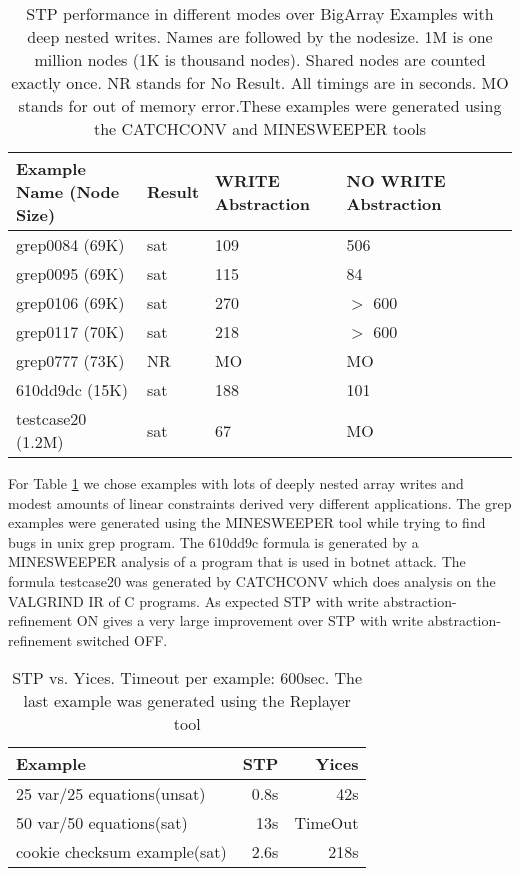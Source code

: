 \begin{table}[t]
\begin{center}
\begin{tabular}{|l|l|l|l|l|l|}
\hline
{\bf Example Name (Node Size)} & {\bf Result} & {\bf WRITE Abstraction} & {\bf NO WRITE Abstraction} \\
\hline
grep0084   (69K) & sat & 109 & 506 \\
grep0095   (69K) & sat & 115 & 84 \\
grep0106   (69K) & sat & 270 & $>$ 600 \\
grep0117   (70K) & sat & 218 & $>$ 600 \\
grep0777   (73K) & NR  &  MO & MO \\
610dd9dc   (15K) & sat & 188 & 101 \\
testcase20 (1.2M)& sat & 67  & MO \\
\hline
\end{tabular}
\end{center}
\caption{STP performance in different modes over BigArray Examples
with deep nested writes. Names are followed by the nodesize. 1M is one
million nodes (1K is thousand nodes). Shared nodes are counted exactly
once. NR stands for No Result.  All timings are in seconds. MO stands
for out of memory error.These examples were generated using the
CATCHCONV and MINESWEEPER tools}
\label{STP-write-abs}
\end{table}

For Table \ref{STP-write-abs} we chose examples with lots of deeply
nested array writes and modest amounts of linear constraints derived
very different applications. The grep examples were generated using
the MINESWEEPER tool while trying to find bugs in unix grep program.
The 610dd9c formula is generated by a MINESWEEPER analysis of a
program that is used in botnet attack. The formula testcase20 was
generated by CATCHCONV which does analysis on the VALGRIND IR of C
programs. As expected STP with write abstraction-refinement ON gives a
very large improvement over STP with write abstraction-refinement
switched OFF.

\begin{table}[t]
\footnotesize
\begin{center}
\begin{tabular}{|l|r|r|}
\hline
{\bf Example} & {\bf STP} & {\bf Yices} \\
\hline
25 var/25 equations(unsat) &  0.8s  & 42s  \\
50 var/50 equations(sat)   &  13s  &  TimeOut \\
cookie checksum example(sat) &  2.6s &  218s \\
\hline
\end{tabular}
\end{center}
\caption{STP vs. Yices. Timeout per example: 600sec. The last example
was generated using the Replayer tool}
\label{STP-Yices-table}
\end{table}

